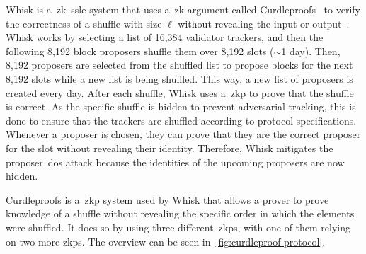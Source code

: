 Whisk is a~\gls{zk}~\gls{ssle} system that uses a~\gls{zk} argument called Curdleproofs~\cite{Curdleproofs} to verify the correctness of a shuffle with size $\ell$ without revealing the input or output~\cite{10.1145/3419614.3423258}.
Whisk works by selecting a list of 16,384 validator trackers, and then the following 8,192 block proposers shuffle them over 8,192 slots ($\sim$1 day).
Then, 8,192 proposers are selected from the shuffled list to propose blocks for the next 8,192 slots while a new list is being shuffled.
This way, a new list of proposers is created every day.
After each shuffle, Whisk uses a~\gls{zkp} to prove that the shuffle is correct.
As the specific shuffle is hidden to prevent adversarial tracking, this is done to ensure that the trackers are shuffled according to protocol specifications.
Whenever a proposer is chosen, they can prove that they are the correct proposer for the slot without revealing their identity.
Therefore, Whisk mitigates the proposer~\gls{dos} attack because the identities of the upcoming proposers are now hidden.

Curdleproofs is a~\gls{zkp} system used by Whisk that allows a prover to prove knowledge of a shuffle without revealing the specific order in which the elements were shuffled.
It does so by using three different~\glspl{zkp}, with one of them relying on two more \glspl{zkp}.
The overview can be seen in~\autoref{fig:curdleproof-protocol}.

